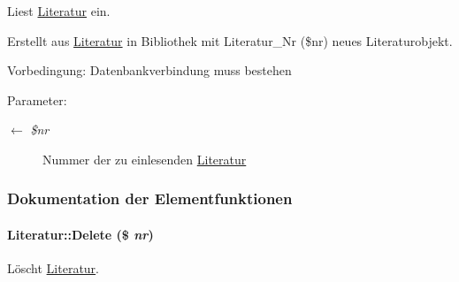 Liest \hyperlink{classLiteratur}{Literatur} ein. 

Erstellt aus \hyperlink{classLiteratur}{Literatur} in Bibliothek mit Literatur\_\-Nr (\$nr) neues Literaturobjekt. \begin{Desc}
\item[Vorbedingung:]Datenbankverbindung muss bestehen \end{Desc}
\begin{Desc}
\item[Parameter:]
\begin{description}
\item[\mbox{$\leftarrow$} {\em \$nr}]Nummer der zu einlesenden \hyperlink{classLiteratur}{Literatur} \end{description}
\end{Desc}


\subsubsection{Dokumentation der Elementfunktionen}
\hypertarget{classLiteratur_f5b265d349df2a9d17079b81d808fa89}{
\paragraph[Delete]{\setlength{\rightskip}{0pt plus 5cm}Literatur::Delete (\$ {\em nr})}\hfill}
\label{classLiteratur_f5b265d349df2a9d17079b81d808fa89}


Löscht \hyperlink{classLiteratur}{Literatur}. 

